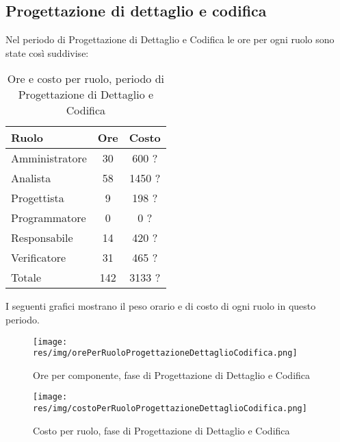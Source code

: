 \subsection{Progettazione di dettaglio e codifica}
Nel periodo di Progettazione di Dettaglio e Codifica le ore per ogni ruolo sono state così suddivise:

\begin{table}[H]
	\centering
	\begin{tabular}{ l c c }
		\textbf{Ruolo} & \textbf{Ore} & \textbf{Costo} \\
		\hline
		Amministratore & 30 & 600 ? \\
		Analista & 58 & 1450 ? \\
		Progettista & 9 & 198 ? \\
		Programmatore & 0 & 0 ? \\
		Responsabile & 14 & 420 ? \\
		Verificatore & 31 & 465 ? \\
		\hline
		Totale & 142 & 3133 ? \\
		\hline
	\end{tabular}
	\caption{Ore e costo per ruolo, periodo di Progettazione di Dettaglio e Codifica}
\end{table}

I seguenti grafici mostrano il peso orario e di costo di ogni ruolo in questo periodo.

\begin{figure}[H]
  \begin{center}
    \texttt{[image: res/img/orePerRuoloProgettazioneDettaglioCodifica.png]}
  \caption{Ore per componente, fase di Progettazione di Dettaglio e Codifica}
  \end{center} 
\end{figure}  

\begin{figure}[H]
  \begin{center}
    \texttt{[image: res/img/costoPerRuoloProgettazioneDettaglioCodifica.png]}
  \caption{Costo per ruolo, fase di Progettazione di Dettaglio e Codifica}
  \end{center} 
\end{figure}  


